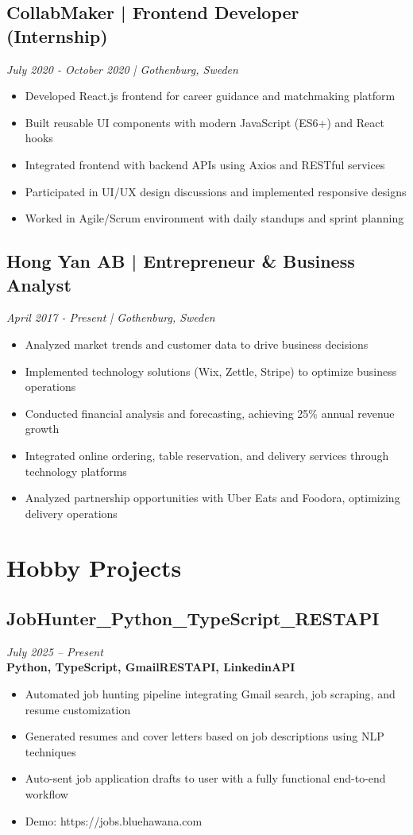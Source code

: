 \documentclass[11pt,a4paper]{article}
\begin{document}
\subsection*{CollabMaker | Frontend Developer (Internship)}
\textit{July 2020 - October 2020 | Gothenburg, Sweden}
\begin{itemize}[noitemsep]
\item Developed React.js frontend for career guidance and matchmaking platform
\item Built reusable UI components with modern JavaScript (ES6+) and React hooks
\item Integrated frontend with backend APIs using Axios and RESTful services
\item Participated in UI/UX design discussions and implemented responsive designs
\item Worked in Agile/Scrum environment with daily standups and sprint planning
\end{itemize}

\subsection*{Hong Yan AB | Entrepreneur \& Business Analyst}
\textit{April 2017 - Present | Gothenburg, Sweden}
\begin{itemize}[noitemsep]
\item Analyzed market trends and customer data to drive business decisions
\item Implemented technology solutions (Wix, Zettle, Stripe) to optimize business operations
\item Conducted financial analysis and forecasting, achieving 25\% annual revenue growth
\item Integrated online ordering, table reservation, and delivery services through technology platforms
\item Analyzed partnership opportunities with Uber Eats and Foodora, optimizing delivery operations
\end{itemize}

\section*{Hobby Projects}
\subsection{JobHunter\_Python\_TypeScript\_RESTAPI}
\textit{July 2025 -- Present} \\
\textbf{Python, TypeScript, GmailRESTAPI, LinkedinAPI}
\begin{itemize}
\item Automated job hunting pipeline integrating Gmail search, job scraping, and resume customization
\item Generated resumes and cover letters based on job descriptions using NLP techniques
\item Auto-sent job application drafts to user with a fully functional end-to-end workflow
\item Demo: https://jobs.bluehawana.com
\end{itemize}
\end{document}

